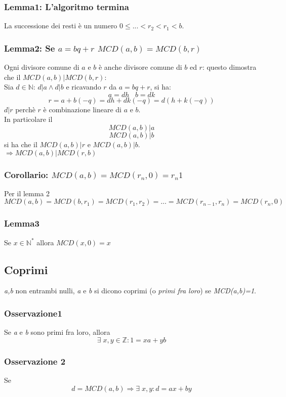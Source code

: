 \subsubsection{Lemma1: L'algoritmo termina}

La successione dei resti è un numero \(0\leq ... <r_2<r_1<b\).

\subsubsection{Lemma2: Se \(a=bq+r\) \(MCD(a,b)=MCD(b,r)\)}
Ogni divisore comune di $a$ e $b$ è anche divisore comune di $b$ ed $r$: questo dimostra che il $MCD(a,b)|MCD(b,r)$:
\\Sia $d\in\mathbb{N}$: $d|a\land d|b$ e ricavando $r$ da $a=bq+r$, si ha:
\[a=dh\;\;\;b=dk\]
\[r=a+b(-q)=dh+dk(-q)=d(h+k(-q))\]
$d|r$ perchè $r$ è combinazione lineare di $a$ e $b$.
\\In particolare il
\[MCD(a,b)|a\]
\[MCD(a,b)|b\]
si ha che il $MCD(a,b)|r$ e $MCD(a,b)|b$.
\\$\Rightarrow MCD(a,b)|MCD(r,b)$

\subsubsection{Corollario: \(MCD(a,b)=MCD(r_n,0)=r_n1\)}
Per il lemma 2 \(MCD(a,b)=MCD(b,r_1)=MCD(r_1,r_2)=...=MCD(r_{n-1},r_n)=MCD(r_n,0)\)

\subsubsection{Lemma3}
Se \(x\in\mathbb{N^*}\) allora \(MCD(x,0)=x\)

\subsection{Coprimi}
\textit{a,b} non entrambi nulli, \textit{a} e \textit{b} si dicono coprimi (o \textit{primi fra loro}) se \textit{MCD(a,b)=1}.

\subsubsection{Osservazione1}
Se \textit{a} e \textit{b} sono primi fra loro, allora \[\exists\; x,y\in\mathbb{Z} : 1=xa+yb\]

\subsubsection{Osservazione 2}
Se \[d=MCD(a,b)\Rightarrow\exists\; x,y:d=ax+by\]

